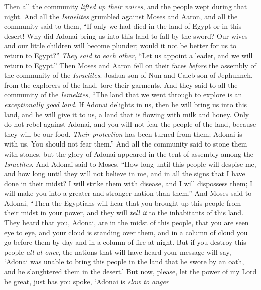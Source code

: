 \begin{biblechapter} %
 Then all the community \textit{lifted up their voices}, and the people wept during that night.
\verse And all the \textit{Israelites} grumbled against Moses and Aaron, and all the community said to them, “If only we had died in the land of Egypt or in this desert!
\verse Why did Adonai bring us into this land to fall by the sword? Our wives and our little children will become plunder; would it not be better for us to return to Egypt?”
\verse \textit{They said to each other}, “Let us appoint a leader, and we will return to Egypt.”
\verse Then Moses and Aaron fell on their faces \textit{before} the assembly of the community of the \textit{Israelites}.
\verse Joshua son of Nun and Caleb son of Jephunneh, from the explorers of the land, tore their garments.
\verse And they said to all the community of the \textit{Israelites}, “The land that we went through to explore is an \textit{exceptionally good land}.
\verse If Adonai delights in us, then he will bring us into this land, and he will give it to us, a land that is flowing with milk and honey.
\verse Only do not rebel against Adonai, and you will not fear the people of the land, because they will be our food. \textit{Their protection} has been turned from them; Adonai is with us. You should not fear them.”
\verse And all the community said to stone them with stones, but the glory of Adonai appeared in the tent of assembly among the \textit{Israelites}.
\verse And Adonai said to Moses, “How long until this people will despise me, and how long until they will not believe in me, and in all the signs that I have done in their midst?
\verse I will strike them with disease, and I will dispossess them; I will make you into a greater and stronger nation than them.”
\verse And Moses said to Adonai, “Then the Egyptians will hear that you brought up this people from their midst in your power,
\verse and they will \textit{tell it} to the inhabitants of this land. They heard that you, Adonai, are in the midst of this people, that you are seen eye to eye, and your cloud is standing over them, and in a column of cloud you go before them by day and in a column of fire at night.
\verse But if you destroy this people \textit{all at once}, the nations that will have heard your message will say,
\verse ‘Adonai was unable to bring this people in the land that he swore by an oath, and he slaughtered them in the desert.’
\verse But now, please, let the power of my Lord be great, just has you spoke,
\verse ‘Adonai is \textit{slow to anger} 

\end{biblechapter}
